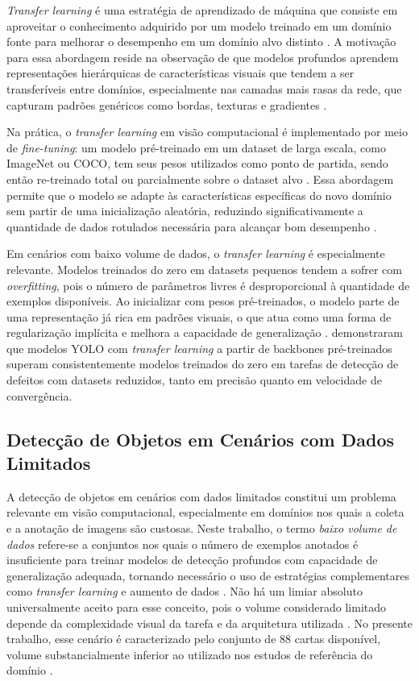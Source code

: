 \documentclass[
    12pt,                %
    openright,           %
    oneside,             %
    a4paper,             %
    english,             %
    brazil               %
]{abntex2}
\begin{document}
\textit{Transfer learning} é uma estratégia de aprendizado de
máquina que consiste em aproveitar o conhecimento adquirido por
um modelo treinado em um domínio fonte para melhorar o
desempenho em um domínio alvo distinto \cite{Situ2023}.
A motivação para essa abordagem reside na observação de que
modelos profundos aprendem representações hierárquicas de
características visuais que tendem a ser transferíveis entre
domínios, especialmente nas camadas mais rasas da rede, que
capturam padrões genéricos como bordas, texturas e gradientes
\cite{Situ2023}.

Na prática, o \textit{transfer learning} em visão computacional
é implementado por meio de \textit{fine-tuning}: um modelo
pré-treinado em um dataset de larga escala, como ImageNet ou
COCO, tem seus pesos utilizados como ponto de partida, sendo
então re-treinado total ou parcialmente sobre o dataset alvo
\cite{Dobrzycki2025}. Essa abordagem permite que o modelo se
adapte às características específicas do novo domínio sem
partir de uma inicialização aleatória, reduzindo
significativamente a quantidade de dados rotulados necessária
para alcançar bom desempenho \cite{Situ2023}.

Em cenários com baixo volume de dados, o \textit{transfer
learning} é especialmente relevante. Modelos treinados do
zero em datasets pequenos tendem a sofrer com
\textit{overfitting}, pois o número de parâmetros livres é
desproporcional à quantidade de exemplos disponíveis. Ao
inicializar com pesos pré-treinados, o modelo parte de uma
representação já rica em padrões visuais, o que atua como
uma forma de regularização implícita e melhora a capacidade
de generalização \cite{Dobrzycki2025}. 
demonstraram que modelos YOLO com \textit{transfer learning}
a partir de backbones pré-treinados superam consistentemente
modelos treinados do zero em tarefas de detecção de defeitos
com datasets reduzidos, tanto em precisão quanto em velocidade
de convergência.

\subsection{Detecção de Objetos em Cenários com Dados Limitados}
\label{subsec:low_data_detection}

A detecção de objetos em cenários com dados limitados constitui um
problema relevante em visão computacional, especialmente em domínios
nos quais a coleta e a anotação de imagens são custosas. Neste trabalho,
o termo \textit{baixo volume de dados} refere-se a conjuntos nos quais
o número de exemplos anotados é insuficiente para treinar modelos de
detecção profundos com capacidade de generalização adequada, tornando
necessário o uso de estratégias complementares como \textit{transfer
learning} e aumento de dados \cite{Chen2021}. Não há um limiar absoluto
universalmente aceito para esse conceito, pois o volume considerado
limitado depende da complexidade visual da tarefa e da arquitetura
utilizada \cite{Wang2022}. No presente trabalho, esse cenário é
caracterizado pelo conjunto de 88 cartas disponível, volume
substancialmente inferior ao utilizado nos estudos de referência do
domínio \cite{Nahar2025}.
\end{document}
